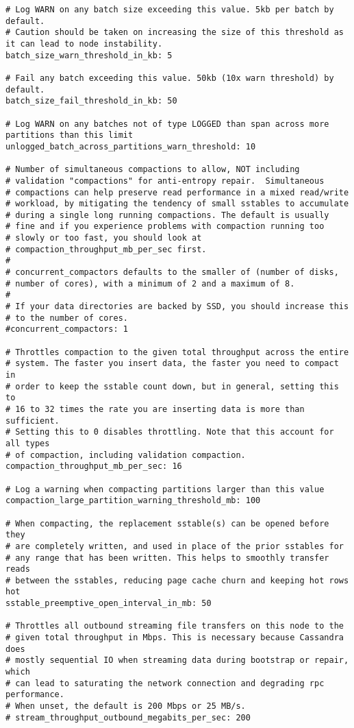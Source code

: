 \begin{verbatim}
# Log WARN on any batch size exceeding this value. 5kb per batch by default.
# Caution should be taken on increasing the size of this threshold as it can lead to node instability.
batch_size_warn_threshold_in_kb: 5

# Fail any batch exceeding this value. 50kb (10x warn threshold) by default.
batch_size_fail_threshold_in_kb: 50

# Log WARN on any batches not of type LOGGED than span across more partitions than this limit
unlogged_batch_across_partitions_warn_threshold: 10

# Number of simultaneous compactions to allow, NOT including
# validation "compactions" for anti-entropy repair.  Simultaneous
# compactions can help preserve read performance in a mixed read/write
# workload, by mitigating the tendency of small sstables to accumulate
# during a single long running compactions. The default is usually
# fine and if you experience problems with compaction running too
# slowly or too fast, you should look at
# compaction_throughput_mb_per_sec first.
#
# concurrent_compactors defaults to the smaller of (number of disks,
# number of cores), with a minimum of 2 and a maximum of 8.
# 
# If your data directories are backed by SSD, you should increase this
# to the number of cores.
#concurrent_compactors: 1

# Throttles compaction to the given total throughput across the entire
# system. The faster you insert data, the faster you need to compact in
# order to keep the sstable count down, but in general, setting this to
# 16 to 32 times the rate you are inserting data is more than sufficient.
# Setting this to 0 disables throttling. Note that this account for all types
# of compaction, including validation compaction.
compaction_throughput_mb_per_sec: 16

# Log a warning when compacting partitions larger than this value
compaction_large_partition_warning_threshold_mb: 100

# When compacting, the replacement sstable(s) can be opened before they
# are completely written, and used in place of the prior sstables for
# any range that has been written. This helps to smoothly transfer reads 
# between the sstables, reducing page cache churn and keeping hot rows hot
sstable_preemptive_open_interval_in_mb: 50

# Throttles all outbound streaming file transfers on this node to the
# given total throughput in Mbps. This is necessary because Cassandra does
# mostly sequential IO when streaming data during bootstrap or repair, which
# can lead to saturating the network connection and degrading rpc performance.
# When unset, the default is 200 Mbps or 25 MB/s.
# stream_throughput_outbound_megabits_per_sec: 200


\end{verbatim}
